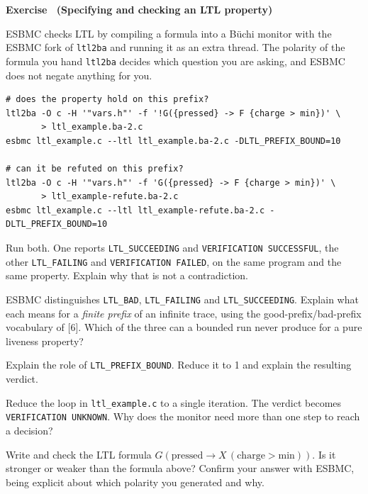 \documentclass[11pt,a4paper]{article}
\newcommand{\esbmc}{ESBMC}
\newcommand{\file}[1]{\texttt{\small #1}}
\newcounter{exc}
\renewcommand{\theexc}{\arabic{exc}}
\newenvironment{exercise}[2][]
  {\stepcounter{exc}\ifx\relax#1\relax\else\excref{#1}\fi%
   \medskip\noindent\textbf{Exercise \theexc\ (#2)}\par\nopagebreak\smallskip}
  {\par\medskip}
\begin{document}
\begin{exercise}{Specifying and checking an LTL property}
\esbmc{} checks LTL by compiling a formula into a Büchi monitor with the ESBMC
fork of \texttt{ltl2ba} and running it as an extra thread. The polarity of the
formula you hand \texttt{ltl2ba} decides which question you are asking, and
\esbmc{} does not negate anything for you.

\begin{lstlisting}[style=sh]
# does the property hold on this prefix?
ltl2ba -O c -H '"vars.h"' -f '!G({pressed} -> F {charge > min})' \
       > ltl_example.ba-2.c
esbmc ltl_example.c --ltl ltl_example.ba-2.c -DLTL_PREFIX_BOUND=10

# can it be refuted on this prefix?
ltl2ba -O c -H '"vars.h"' -f 'G({pressed} -> F {charge > min})' \
       > ltl_example-refute.ba-2.c
esbmc ltl_example.c --ltl ltl_example-refute.ba-2.c -DLTL_PREFIX_BOUND=10
\end{lstlisting}

\begin{parts}
  \item Run both. One reports \texttt{LTL\_SUCCEEDING} and
        \texttt{VERIFICATION SUCCESSFUL}, the other \texttt{LTL\_FAILING} and
        \texttt{VERIFICATION FAILED}, on the same program and the same
        property. Explain why that is not a contradiction.
  \item \esbmc{} distinguishes \texttt{LTL\_BAD}, \texttt{LTL\_FAILING} and
        \texttt{LTL\_SUCCEEDING}. Explain what each means for a \emph{finite
        prefix} of an infinite trace, using the good-prefix/bad-prefix
        vocabulary of [6]. Which of the three can a bounded run never produce
        for a pure liveness property?
  \item Explain the role of \texttt{LTL\_PREFIX\_BOUND}. Reduce it to 1 and
        explain the resulting verdict.
  \item Reduce the loop in \file{ltl\_example.c} to a single iteration. The
        verdict becomes \texttt{VERIFICATION UNKNOWN}. Why does the monitor
        need more than one step to reach a decision?
  \item Write and check the LTL formula
        $G(\text{pressed} \rightarrow X\,(\text{charge} > \text{min}))$. Is it
        stronger or weaker than the formula above? Confirm your answer with
        \esbmc{}, being explicit about which polarity you generated and why.
\end{parts}
\end{exercise}
\end{document}
